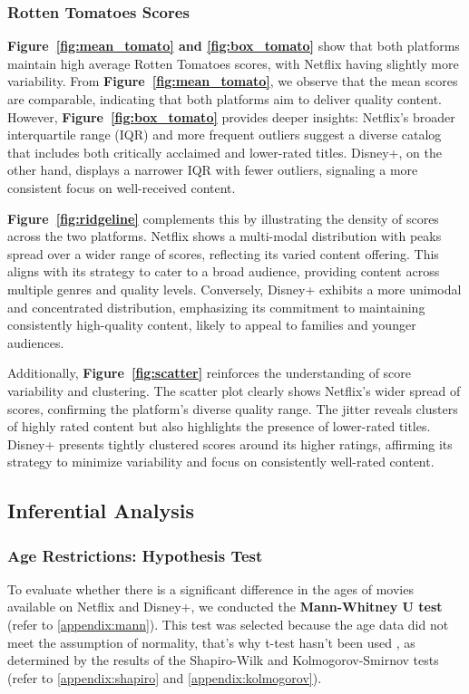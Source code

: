 \subsubsection{Rotten Tomatoes Scores}

\textbf{Figure~\ref{fig:mean_tomato} and \ref{fig:box_tomato}} show that both platforms maintain high average Rotten Tomatoes scores, with Netflix having slightly more variability. From \textbf{Figure~\ref{fig:mean_tomato}}, we observe that the mean scores are comparable, indicating that both platforms aim to deliver quality content. However, \textbf{Figure~\ref{fig:box_tomato}} provides deeper insights: Netflix's broader interquartile range (IQR) and more frequent outliers suggest a diverse catalog that includes both critically acclaimed and lower-rated titles. Disney+, on the other hand, displays a narrower IQR with fewer outliers, signaling a more consistent focus on well-received content.

\textbf{Figure~\ref{fig:ridgeline}} complements this by illustrating the density of scores across the two platforms. Netflix shows a multi-modal distribution with peaks spread over a wider range of scores, reflecting its varied content offering. This aligns with its strategy to cater to a broad audience, providing content across multiple genres and quality levels. Conversely, Disney+ exhibits a more unimodal and concentrated distribution, emphasizing its commitment to maintaining consistently high-quality content, likely to appeal to families and younger audiences.

Additionally, \textbf{Figure~\ref{fig:scatter}} reinforces the understanding of score variability and clustering. The scatter plot clearly shows Netflix's wider spread of scores, confirming the platform's diverse quality range. The jitter reveals clusters of highly rated content but also highlights the presence of lower-rated titles. Disney+ presents tightly clustered scores around its higher ratings, affirming its strategy to minimize variability and focus on consistently well-rated content.

\subsection{Inferential Analysis}
\subsubsection{Age Restrictions: Hypothesis Test}

To evaluate whether there is a significant difference in the ages of movies available on Netflix and Disney+, we conducted the \textbf{Mann-Whitney U test} (refer to \autoref{appendix:mann}). This test was selected because the age data did not meet the assumption of normality, that's why t-test hasn't been used \cite{student1908}, as determined by the results of the Shapiro-Wilk and Kolmogorov-Smirnov tests (refer to \autoref{appendix:shapiro} and \autoref{appendix:kolmogorov}). 

